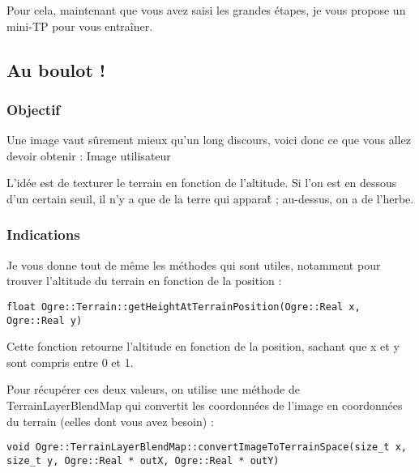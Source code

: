 \documentclass[10pt,a4paper]{report}
\begin{document}
Pour cela, maintenant que vous avez saisi les grandes \'etapes, je vous propose un mini-TP pour vous entra\^iner.








\subsection{Au boulot !}



\subsubsection{Objectif}

Une image vaut s\^urement mieux qu'un long discours, voici donc ce que vous allez devoir obtenir :
Image utilisateur

L'id\'ee est de texturer le terrain en fonction de l'altitude. Si l'on est en dessous d'un certain seuil, il n'y a que de la terre qui appara\^t ; au-dessus, on a de l'herbe.



\subsubsection{Indications}

Je vous donne tout de m\^eme les m\'ethodes qui sont utiles, notamment pour trouver l'altitude du terrain en fonction de la position :

\begin{lstlisting}[caption={m\'ethode getHeightAtTerrainPosition pour trouver l'altitude du terrain en fonction de la position }]
float Ogre::Terrain::getHeightAtTerrainPosition(Ogre::Real x, Ogre::Real y)
\end{lstlisting}

Cette fonction retourne l'altitude en fonction de la position, sachant que x et y sont compris entre 0 et 1.

Pour r\'ecup\'erer ces deux valeurs, on utilise une m\'ethode de TerrainLayerBlendMap qui convertit les coordonn\'ees de l'image en coordonn\'ees du terrain (celles dont vous avez besoin) :

\begin{lstlisting}[caption={M\'ethode convertImageToTerrainSpace pour convertir les coordonn\'ees de l'image en coordonn\'ees du terrain}]
void Ogre::TerrainLayerBlendMap::convertImageToTerrainSpace(size_t x, size_t y, Ogre::Real * outX, Ogre::Real * outY)
\end{lstlisting}
\end{document}
